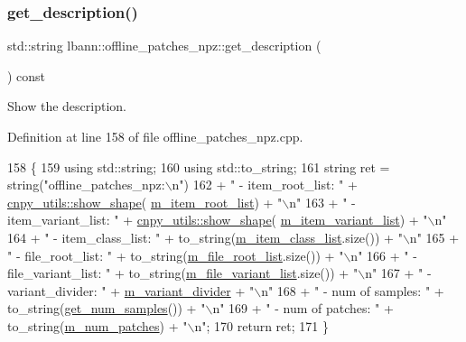 \subsubsection{\texorpdfstring{get\+\_\+description()}{get\_description()}}
{\footnotesize\ttfamily std\+::string lbann\+::offline\+\_\+patches\+\_\+npz\+::get\+\_\+description (\begin{DoxyParamCaption}{ }\end{DoxyParamCaption}) const}



Show the description. 



Definition at line 158 of file offline\+\_\+patches\+\_\+npz.\+cpp.


\begin{DoxyCode}
158                                                      \{
159   \textcolor{keyword}{using} std::string;
160   \textcolor{keyword}{using} std::to\_string;
161   \textcolor{keywordtype}{string} ret = string(\textcolor{stringliteral}{"offline\_patches\_npz:\(\backslash\)n"})
162     + \textcolor{stringliteral}{" - item\_root\_list: "}    + \hyperlink{namespacelbann_1_1cnpy__utils_a120e5719167d6d20b2a98c4282fd7a50}{cnpy\_utils::show\_shape}(
      \hyperlink{classlbann_1_1offline__patches__npz_a5d61c89e80f8e67b4850fb72792ce862}{m\_item\_root\_list}) + \textcolor{stringliteral}{"\(\backslash\)n"}
163     + \textcolor{stringliteral}{" - item\_variant\_list: "} + \hyperlink{namespacelbann_1_1cnpy__utils_a120e5719167d6d20b2a98c4282fd7a50}{cnpy\_utils::show\_shape}(
      \hyperlink{classlbann_1_1offline__patches__npz_a5aec35e7b2f9956b8e7e8ce5cbb3ff22}{m\_item\_variant\_list}) + \textcolor{stringliteral}{"\(\backslash\)n"}
164     + \textcolor{stringliteral}{" - item\_class\_list: "}   + to\_string(\hyperlink{classlbann_1_1offline__patches__npz_a5f90dc1b898f8ad9d7ea16c188738419}{m\_item\_class\_list}.size()) + \textcolor{stringliteral}{"\(\backslash\)n"}
165     + \textcolor{stringliteral}{" - file\_root\_list: "}    + to\_string(\hyperlink{classlbann_1_1offline__patches__npz_a515ef05ef0679f3b6f1197d1ab47bfb3}{m\_file\_root\_list}.size()) + \textcolor{stringliteral}{"\(\backslash\)n"}
166     + \textcolor{stringliteral}{" - file\_variant\_list: "} + to\_string(\hyperlink{classlbann_1_1offline__patches__npz_a164d2bd134dc8c3946dc28d6ec5da0ec}{m\_file\_variant\_list}.size()) + \textcolor{stringliteral}{"\(\backslash\)n"}
167     + \textcolor{stringliteral}{" - variant\_divider: "}   + \hyperlink{classlbann_1_1offline__patches__npz_aaab0b9040ce248875b6cdb430e054b3a}{m\_variant\_divider} + \textcolor{stringliteral}{"\(\backslash\)n"}
168     + \textcolor{stringliteral}{" - num of samples: "}    + to\_string(\hyperlink{classlbann_1_1offline__patches__npz_aa6fa05575f54a29b67d0bba8a2a9d363}{get\_num\_samples}()) + \textcolor{stringliteral}{"\(\backslash\)n"}
169     + \textcolor{stringliteral}{" - num of patches: "}    + to\_string(\hyperlink{classlbann_1_1offline__patches__npz_a5c13583d344641295301f82a32ebee41}{m\_num\_patches}) + \textcolor{stringliteral}{"\(\backslash\)n"};
170   \textcolor{keywordflow}{return} ret;
171 \}
\end{DoxyCode}
